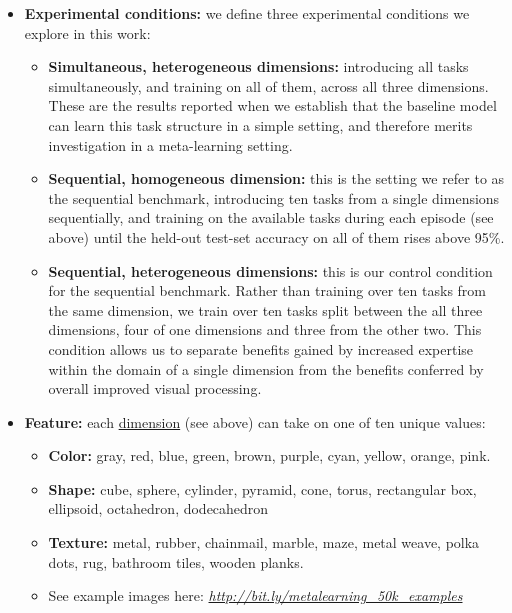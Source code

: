 \begin{itemize}
\item \textbf{Experimental conditions:\label{tg:experimental-condition}} we define three experimental conditions we explore in this work:
  \begin{itemize}
  \item \textbf{Simultaneous, heterogeneous dimensions:} introducing all tasks simultaneously, and training on all of them, across all three dimensions. These are the results reported when we establish that the baseline model can learn this task structure in a simple setting, and therefore merits investigation in a meta-learning setting.
    
  \item \textbf{Sequential, homogeneous dimension:} this is the setting we refer to as the sequential benchmark, introducing ten tasks from a single dimensions sequentially, and training on the available tasks during each episode (see above) until the held-out test-set accuracy on all of them rises above 95\%.
    
  \item \textbf{Sequential, heterogeneous dimensions:} this is our control condition for the sequential benchmark. Rather than training over ten tasks from the same dimension, we train over ten tasks split between the all three dimensions, four of one dimensions and three from the other two. This condition allows us to separate benefits gained by increased expertise within the domain of a single dimension from the benefits conferred by overall improved visual processing.
  \end{itemize}
  
\item \textbf{Feature:\label{tg:feature}} each \hyperref[tg:dimension]{dimension} (see above) can take on one of ten unique values:
  \begin{itemize}
  \item \textbf{Color:} gray, red, blue, green, brown, purple, cyan, yellow, orange, pink.
    
  \item \textbf{Shape:} cube, sphere, cylinder, pyramid, cone, torus, rectangular box, ellipsoid, octahedron, dodecahedron
    
  \item \textbf{Texture:} metal, rubber, chainmail, marble, maze, metal weave, polka dots, rug, bathroom tiles, wooden planks.
    
  \item See example images here: \href{http://bit.ly/metalearning_50k_examples}{\emph{http://bit.ly/metalearning\_50k\_examples}}
    

\end{itemize}
\end{itemize}
